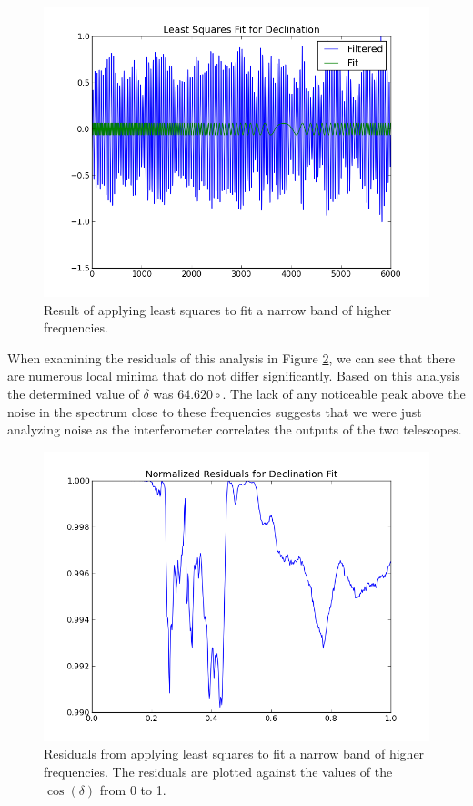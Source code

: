 \documentclass{article}
\begin{document}
    \begin{figure}[h!]
    \centering
    \includegraphics[scale=0.5]{img/crab/fit_dec.png}
    \caption{Result of applying least squares to fit a narrow band of higher
    frequencies.}
    \label{fig:fit_dec}
    \end{figure}

    When examining the residuals of this analysis in Figure
    \ref{fig:residual_dec}, we can see that there are numerous local minima
    that do not differ significantly. Based on this analysis the determined
    value of $\delta$ was $64.620\circ$.  The lack of any noticeable peak above the noise in the spectrum close to
    these frequencies suggests that we were just analyzing noise as the
    interferometer correlates the outputs of the two telescopes.

    \begin{figure}[htbp!]
    \centering
    \includegraphics[scale=0.5]{img/crab/residual_dec.png}
    \caption{Residuals from applying least squares to fit a narrow band of higher
    frequencies. The residuals are plotted against the values of the
$\cos(\delta)$ from 0 to 1.}
    \label{fig:residual_dec}
    \end{figure}
\end{document}
